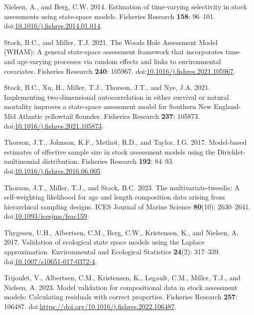 \documentclass[
]{article}
\newlength{\cslhangindent}
\newlength{\cslentryspacingunit} %
\newenvironment{CSLReferences}[2] %
 {%
  \setlength{\parindent}{0pt}
  \ifodd #1
  \let\oldpar\par
  \def\par{\hangindent=\cslhangindent\oldpar}
  \fi
  \setlength{\parskip}{#2\cslentryspacingunit}
 }%
 {}
\begin{document}
\begin{CSLReferences}{1}{0}
\leavevmode{}%
Nielsen, A., and Berg, C.W. 2014. Estimation of time-varying selectivity
in stock assessments using state-space models. Fisheries Research
\textbf{158}: 96--101.
doi:\href{https://doi.org/10.1016/j.fishres.2014.01.014}{10.1016/j.fishres.2014.01.014}.

\leavevmode{}%
Stock, B.C., and Miller, T.J. 2021. The {Woods Hole Assessment Model}
({WHAM}): A general state-space assessment framework that incorporates
time- and age-varying processes via random effects and links to
environmental covariates. Fisheries Research \textbf{240}: 105967.
doi:\href{https://doi.org/10.1016/j.fishres.2021.105967}{10.1016/j.fishres.2021.105967}.

\leavevmode{}%
Stock, B.C., Xu, H., Miller, T.J., Thorson, J.T., and Nye, J.A. 2021.
Implementing two-dimensional autocorrelation in either survival or
natural mortality improves a state-space assessment model for {Southern
New England}-{Mid Atlantic} yellowtail flounder. Fisheries Research
\textbf{237}: 105873.
doi:\href{https://doi.org/10.1016/j.fishres.2021.105873}{10.1016/j.fishres.2021.105873}.

\leavevmode{}%
Thorson, J.T., Johnson, K.F., Methot, R.D., and Taylor, I.G. 2017.
Model-based estimates of effective sample size in stock assessment
models using the {D}irichlet-multinomial distribution. Fisheries
Research \textbf{192}: 84--93.
doi:\href{https://doi.org/10.1016/j.fishres.2016.06.005}{10.1016/j.fishres.2016.06.005}.

\leavevmode{}%
Thorson, J.T., Miller, T.J., and Stock, B.C. 2023. The
multivariate-tweedie: A self-weighting likelihood for age and length
composition data arising from hierarchical sampling designs. ICES
Journal of Marine Science \textbf{80}(10): 2630--2641.
doi:\href{https://doi.org/10.1093/icesjms/fsac159}{10.1093/icesjms/fsac159}.

\leavevmode{}%
Thygesen, U.H., Albertsen, C.M., Berg, C.W., Kristensen, K., and
Nielsen, A. 2017. {Validation of ecological state space models using the
Laplace approximation}. Environmental and Ecological Statistics
\textbf{24}(2): 317--339.
doi:\href{https://doi.org/10.1007/s10651-017-0372-4}{10.1007/s10651-017-0372-4}.

\leavevmode{}%
Trijoulet, V., Albertsen, C.M., Kristensen, K., Legault, C.M., Miller,
T.J., and Nielsen, A. 2023. Model validation for compositional data in
stock assessment models: Calculating residuals with correct properties.
Fisheries Research \textbf{257}: 106487.
doi:\url{https://doi.org/10.1016/j.fishres.2022.106487}.

\end{CSLReferences}
\end{document}
